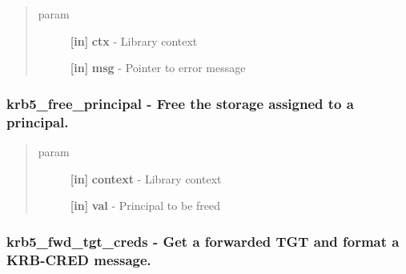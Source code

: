\documentclass[letterpaper,10pt,english]{sphinxmanual}
\begin{document}
\begin{fulllineitems}
\label{appdev/refs/api/krb5_free_error_message:krb5_free_error_message}
\end{fulllineitems}

\begin{quote}\begin{description}
\item[{param}] \leavevmode
\textbf{{[}in{]}} \textbf{ctx} - Library context

\textbf{{[}in{]}} \textbf{msg} - Pointer to error message

\end{description}\end{quote}


\subsubsection{krb5\_free\_principal -  Free the storage assigned to a principal.}
\label{appdev/refs/api/krb5_free_principal::doc}\label{appdev/refs/api/krb5_free_principal:krb5-free-principal-free-the-storage-assigned-to-a-principal}

\begin{fulllineitems}
\label{appdev/refs/api/krb5_free_principal:krb5_free_principal}
\end{fulllineitems}

\begin{quote}\begin{description}
\item[{param}] \leavevmode
\textbf{{[}in{]}} \textbf{context} - Library context

\textbf{{[}in{]}} \textbf{val} - Principal to be freed

\end{description}\end{quote}


\subsubsection{krb5\_fwd\_tgt\_creds -  Get a forwarded TGT and format a KRB-CRED message.}
\label{appdev/refs/api/krb5_fwd_tgt_creds:krb5-fwd-tgt-creds-get-a-forwarded-tgt-and-format-a-krb-cred-message}\label{appdev/refs/api/krb5_fwd_tgt_creds::doc}
\end{document}
